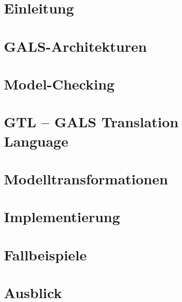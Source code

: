 \documentclass[
  10pt,
  a4paper,
  twoside,
  titlepage,
  headings=normal,
  bibliography=totoc]{scrbook}
\begin{document}
\tableofcontents

\chapter{Einleitung}

\chapter{GALS-Architekturen}

\chapter{Model-Checking}


\chapter{GTL -- GALS Translation Language}

\chapter{Modelltransformationen}




\chapter{Implementierung}







\chapter{Fallbeispiele}
\chapter{Ausblick}

\begin{appendix}
  
  
\end{appendix}
\end{document}
